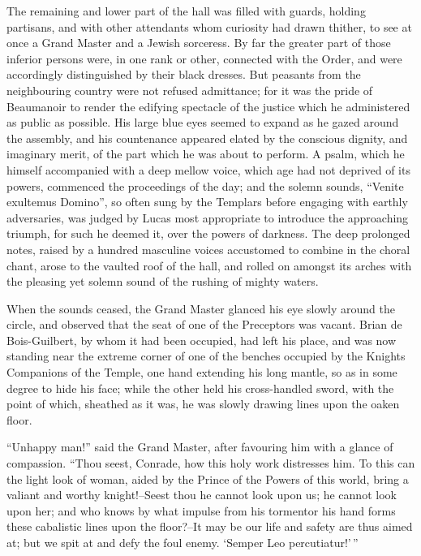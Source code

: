 The remaining and lower part of the hall was filled with guards, holding
partisans, and with other attendants whom curiosity had drawn thither,
to see at once a Grand Master and a Jewish sorceress. By far the greater
part of those inferior persons were, in one rank or other, connected
with the Order, and were accordingly distinguished by their black
dresses. But peasants from the neighbouring country were not refused
admittance; for it was the pride of Beaumanoir to render the edifying
spectacle of the justice which he administered as public as possible.
His large blue eyes seemed to expand as he gazed around the assembly,
and his countenance appeared elated by the conscious dignity, and
imaginary merit, of the part which he was about to perform. A psalm,
which he himself accompanied with a deep mellow voice, which age had not
deprived of its powers, commenced the proceedings of the day; and the
solemn sounds, ``Venite exultemus Domino'', so often sung by the
Templars before engaging with earthly adversaries, was judged by Lucas
most appropriate to introduce the approaching triumph, for such he
deemed it, over the powers of darkness. The deep prolonged notes, raised
by a hundred masculine voices accustomed to combine in the choral chant,
arose to the vaulted roof of the hall, and rolled on amongst its arches
with the pleasing yet solemn sound of the rushing of mighty waters.

When the sounds ceased, the Grand Master glanced his eye slowly around
the circle, and observed that the seat of one of the Preceptors was
vacant. Brian de Bois-Guilbert, by whom it had been occupied, had left
his place, and was now standing near the extreme corner of one of the
benches occupied by the Knights Companions of the Temple, one hand
extending his long mantle, so as in some degree to hide his face; while
the other held his cross-handled sword, with the point of which,
sheathed as it was, he was slowly drawing lines upon the oaken floor.

``Unhappy man!'' said the Grand Master, after favouring him with a
glance of compassion. ``Thou seest, Conrade, how this holy work
distresses him. To this can the light look of woman, aided by the Prince
of the Powers of this world, bring a valiant and worthy knight!--Seest
thou he cannot look upon us; he cannot look upon her; and who knows by
what impulse from his tormentor his hand forms these cabalistic lines
upon the floor?--It may be our life and safety are thus aimed at; but we
spit at and defy the foul enemy. `Semper Leo percutiatur!'\,''


